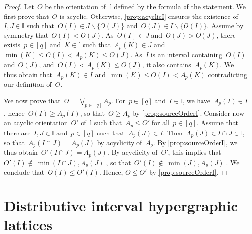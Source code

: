 \documentclass[reqno]{amsart}
\theoremstyle{definition}
\newcommand{\ssm}{\smallsetminus} %
\newcommand{\bigJoin}{\bigvee} %
\newcommand{\II}{\mathbb I} %
\begin{document}
\begin{proof}
Let~$O$ be the orientation of~$\II$ defined by the formula of the statement.
We first prove that~$O$ is acyclic.
Otherwise, \cref{prop:acyclicI} ensures the existence of~$I,J \in \II$ such that~$O(I) \in J \ssm \{O(J)\}$ and~$O(J) \in I \ssm \{O(I)\}$.
Assume by symmetry that~$O(I) < O(J)$.
As~$O(I) \in J$ and~$O(J) > O(J)$, there exists~$p \in [q]$ and~$K \in \II$ such that~$A_p(K) \in J$ and~$\min(K) \le O(I) < A_p(K) \le O(J)$.
As~$I$ is an interval containing~$O(I)$ and~$O(J)$, and~$O(I) < A_p(K) \le O(J)$, it also contains~$A_p(K)$.
We thus obtain that~$A_p(K) \in I$ and~$\min(K) \le O(I) < A_p(K)$ contradicting our definition of~$O$.

We now prove that~$O = \bigJoin_{p \in [q]} A_p$.
For~$p \in [q]$ and~$I \in \II$, we have~$A_p(I) \in I$, hence~${O(I) \ge A_p(I)}$, so that~$O \ge A_p$ by \cref{prop:sourceOrderI}.
Consider now an acyclic orientation~$O'$ of~$\II$ such that~$A_p \le O'$ for all~$p \in [q]$.
Assume that there are~$I, J \in \II$ and~$p \in [q]$ such that~$A_p(J) \in I$.
Then~$A_p(J) \in I \cap J \in \II$, so that~$A_p(I \cap J) = A_p(J)$ by acyclicity of~$A_p$.
By \cref{prop:sourceOrderI}, we thus obtain~$O'(I \cap J) = A_p(J)$.
By acyclicity of~$O'$, this implies that~$O'(I) \notin {[\min(I \cap J), A_p(J)[}$, so that~$O'(I) \notin [\min(J), A_p(J)[$.
We conclude that~$O(I) \le O'(I)$.
Hence, $O \le O'$ by \cref{prop:sourceOrderI}.
\end{proof}


\section{Distributive interval hypergraphic lattices}
\label{sec:distributive}
\end{document}
